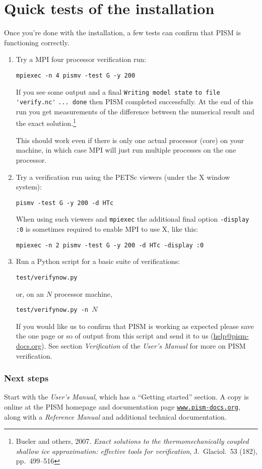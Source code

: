 \documentclass[11pt,final]{amsart}
\renewcommand{\t}[1]{\texttt{#1}}
\begin{document}
\section{Quick tests of the installation}
Once you're done with the installation, a few tests can confirm that PISM is functioning correctly.
\begin{enumerate}
\item Try a MPI four processor verification run:

\verb|mpiexec -n 4 pismv -test G -y 200|

\noindent If you see some output and a final \verb|Writing model state| \verb|to file 'verify.nc'| \verb|... done| then PISM
completed successfully.  At the end of this run you get measurements of the difference between the numerical result and
the exact solution.\footnote{Bueler and others, 2007.  \emph{Exact solutions to the thermomechanically coupled shallow ice approximation: effective tools for verification}, J.~Glaciol.~53 (182), pp.~499--516}

\noindent This should work even if there is only one actual processor (core) on your machine, in which case MPI will just run multiple processes on the one processor.

\item Try a verification run using the PETSc viewers (under the X window system):

\verb|pismv -test G -y 200 -d HTc|

\noindent When using such viewers and \verb|mpiexec| the additional final option \verb|-display :0| is sometimes required to enable MPI to use X, like this:

\verb|mpiexec -n 2 pismv -test G -y 200 -d HTc -display :0|

\item Run a Python script for a basic suite of verifications:

\verb|test/verifynow.py|

\noindent or, on an $N$ processor machine,

\verb|test/verifynow.py -n |$N$

\noindent If you would like us to confirm that PISM is working as expected please save the one page or so of output from this script and send it to us (\href{mailto:help@pism-docs.org}{help@pism-docs.org}).  See section \emph{Verification} of the \emph{User's Manual} for more on PISM verification.
\end{enumerate}

\subsubsection*{Next steps}  Start with the \emph{User's Manual}, which has a ``Getting started'' section.  A copy is online at the PISM homepage and documentation page \href{http://www.pism-docs.org/}{\t{www.pism-docs.org}}, along with a \emph{Reference Manual} and additional technical documentation.
\end{document}
